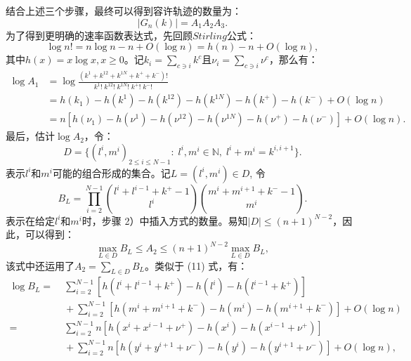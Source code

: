 结合上述三个步骤，最终可以得到容许轨迹的数量为：
\begin{equation}\label{trajectories}
    |G_n(k)|=A_1A_2A_3.
\end{equation}
为了得到更明确的速率函数表达式，先回顾$Stirling$公式：
\begin{equation*}
    \log n! = n\log n-n+O(\log n)=h(n)-n+O(\log n),
\end{equation*}
其中$h(x)=x \log x, x \geqslant 0$。记$k_i=\sum_{c\ni i}k^c$且$\nu_i=\sum_{c\ni i}\nu^c$，那么有：
\begin{equation}\label{log A1}
    \begin{split}
    \log A_1&=\log\frac{(k^1+k^{12}+k^{1N}+k^{+}+k^{-})!}{k^1!\;k^{12}!\;k^{1N}!\;k^{+}!\;k^{-}!}\\
    &= h(k_1)-h(k^1)-h(k^{12})-h(k^{1N})-h(k^+)-h(k^-)+O(\log n)\\
    &= n\left[h(\nu_1)-h(\nu^1)-h(\nu^{12})-h(\nu^{1N})-h(\nu^+)-h(\nu^-)\right]+O(\log n).
    \end{split}
\end{equation}
最后，估计$\log A_2$，令：
\begin{equation*}
    D = \{(l^i,m^i)_{2\le i\le N-1}:\;l^i,m^i\in\mathbb{N},\;l^i+m^i=k^{i,i+1}\}.
\end{equation*}
表示$l^i$和$m^i$可能的组合形成的集合。记$L = (l^i,m^i)\in D$, 令
\begin{equation*}
    B_L=\prod_{i=2}^{N-1}\binom{l^{i}+l^{i-1}+k^{+}-1}{l^{i}}\binom{m^{i}+m^{i+1}+k^{-}-1}{m^{i}}.
\end{equation*}
表示在给定$l^i$和$m^i$时，步骤 2）中插入方式的数量。易知$|D| \leqslant (n+1)^{N-2}$，因此，可以得到：
\begin{equation}\label{inequality}
    \max_{L\in D}B_L \le A_2 \le (n+1)^{N-2} \max_{L\in D}B_L,
\end{equation}
该式中还运用了$A_2 = \sum_{L\in D}B_L$。类似于 (11) 式，有：
\begin{equation}\label{log BL}
    \begin{split}
    \log B_L =&\;\sum_{i=2}^{N-1}[h(l^i+l^{i-1}+k^+)-h(l^i)-h(l^{i-1}+k^+)]\\
    &\;+\sum_{i=2}^{N-1}[h(m^i+m^{i+1}+k^-)-h(m^i)-h(m^{i+1}+k^-)]+O(\log n)\\
    =&\;\sum_{i=2}^{N-1}n[h(x^i+x^{i-1}+\nu^+)-h(x^i)-h(x^{i-1}+\nu^+)]\\
    &\;+\sum_{i=2}^{N-1}n[h(y^i+y^{i+1}+\nu^-)-h(y^i)-h(y^{i+1}+\nu^-)]+O(\log n),
    \end{split}
\end{equation}
